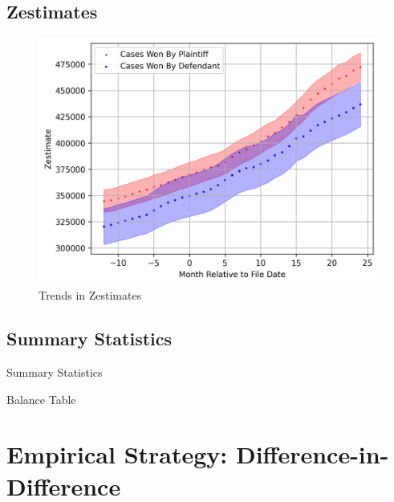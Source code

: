 \documentclass[12pt]{article}
\begin{document}
    \subsection{Zestimates}
        \begin{figure}[H]
            \centering
            \includegraphics{output/summary_statistics/figures/trends_in_zestimates.png}
            \caption{Trends in Zestimates}
            \label{fig:my_label}
        \end{figure}
    \begin{landscape}
    \subsection{Summary Statistics}
         \begin{table}[H]
            \centering
            \small
            
            \caption{Summary Statistics}
            \label{tab:table_1}
        \end{table}
        \newpage
        \begin{table}[H]
            \centering
            \small
            
            \caption{Balance Table}
            \label{tab:my_label}
        \end{table}
    \end{landscape}

\section{Empirical Strategy: Difference-in-Difference}
\end{document}
